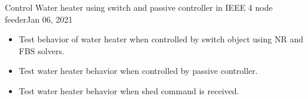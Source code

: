 

\begin{entry}{Control Water heater using switch and passive controller in IEEE 4 node feeder}{Jan 06, 2021}
    \objective 
    \begin{itemize}
        \item Test behavior of water heater when controlled by switch object using NR and FBS solvers.
        \item Test water heater behavior when controlled by passive controller.
        \item Test water heater behavior when shed command is received.
    \end{itemize}
    \outline
    

\end{entry}
